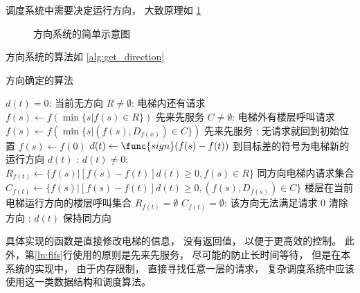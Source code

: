 \documentclass[../main.tex]{subfiles} %
\begin{document}
调度系统中需要决定运行方向，
大致原理如%
\cref{fig:direction}

\begin{figure}[H]
  \centering
  \def\svgwidth{0.6\linewidth}
  
  \caption{方向系统的简单示意图}
  \label{fig:direction}
\end{figure}

方向系统的算法如%
\cref{alg:get_direction}

\begin{algorithm}[H]
  \caption{方向确定的算法}
  \begin{codebox}
      \li \If $d(t) = 0$: \Comment 当前无方向
      \Then
        \li \If $R \neq \emptyset $: \Comment 电梯内还有请求
        \Then
          \li $f(s) \gets f\left(\min \{s|f(s) \in R\} \right)$ \Comment 先来先服务 \label{ln:fifs}
        \li \Else \If $C \neq \emptyset$: \Comment 电梯外有楼层呼叫请求
          \li $f(s) \gets
            f \left(\min \{s|(f(s),D_{f(x)}) \in C\} \right)$ \Comment 先来先服务
        \li \Else: \Comment 无请求就回到初始位置
          \li $f(s) \gets f(0)$
        \End
        \li $d(t) \gets \func{sign}(f(s)-f(t))$ \Comment 到目标差的符号为电梯新的运行方向
        \li \Return $d(t)$
      \End
      \li\Else: \Comment $d(t) \neq 0$:
      \Then
        \li $R_{f(t)} \gets \{f(s) | [f(s)-f(t)]d(t) \geq 0, f(s) \in R\}$
          \Comment 同方向电梯内请求集合
        \li $C_{f(t)} \gets \{f(s) | [f(s)-f(t)]d(t) \geq 0, (f(s),D_{f(s)}) \in C\}$
          \zi \> \Comment 楼层在当前电梯运行方向的楼层呼叫集合
        \li \If $R_{f(t)} = \emptyset$  $C_{f(t)} = \emptyset$: \Comment 该方向无法满足请求
        \Then
          \li \Return $0$ \Comment 清除方向
        \li \Else:
          \li \Return $d(t)$ \Comment 保持同方向
        \End
      \End
  \end{codebox}
  \label{alg:get_direction}
\end{algorithm}
具体实现的函数是直接修改电梯的信息，
没有返回值，
以便于更高效的控制。
此外，第\ref{ln:fifs}行使用的原则是先来先服务，
尽可能的防止长时间等待，
但是在本系统的实现中，
由于内存限制，
直接寻找任意一层的请求，
复杂调度系统中应该使用这一类数据结构和调度算法。
\end{document}

